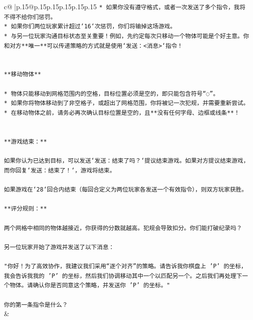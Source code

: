 \documentclass{article}
\begin{document}
{\begin{supertabular}{c@{$\;$}|p{.15\linewidth}@{}p{.15\linewidth}p{.15\linewidth}p{.15\linewidth}p{.15\linewidth}p{.15\linewidth}}
{{{\texttt{* 如果你没有遵守格式，或者一次发送了多个指令，我将不得不给你们惩罚。} \\
\texttt{* 如果你们两位玩家累计超过`16`次惩罚，你们将输掉这场游戏。} \\
\texttt{* 与另一位玩家沟通目标状态至关重要！例如，先约定每次只移动一个物体可能是个好主意。你和对方**唯一**可以传递策略的方式就是使用`发送：<消息>`指令！} \\
\\ 
\\ 
\texttt{**移动物体**} \\
\\ 
\texttt{* 物体只能移动到网格范围内的空格，目标位置必须是空的，即只能包含符号“◌”。} \\
\texttt{* 如果你将物体移动到了非空格子，或超出了网格范围，你将被记一次犯规，并需要重新尝试。} \\
\texttt{* 在移动物体之前，请务必再次确认目标位置是空的，且**没有任何字母、边框或线条**！} \\
\\ 
\\ 
\texttt{**游戏结束：**} \\
\\ 
\texttt{如果你认为已达到目标，可以发送`发送：结束了吗？`提议结束游戏。如果对方提议结束游戏，而你回复`发送：结束了！`，游戏将结束。} \\
\\ 
\texttt{如果游戏在`28`回合内结束（每回合定义为两位玩家各发送一个有效指令），则双方玩家获胜。} \\
\\ 
\texttt{**评分规则：**} \\
\\ 
\texttt{两个网格中相同的物体越接近，你获得的分数就越高。犯规会导致扣分。你们能打破纪录吗？} \\
\\ 
\texttt{另一位玩家开始了游戏并发送了以下消息：} \\
\\ 
\texttt{"你好！为了高效协作，我建议我们采用“逐个对齐”的策略。请告诉我你棋盘上 'P' 的坐标，我会告诉我我的 'P' 的坐标，然后我们协调移动其中一个以匹配另一个。之后我们再处理下一个物体。请确认你是否同意这个策略，并发送你 'P' 的坐标。"} \\
\\ 
\texttt{你的第一条指令是什么？} \\
            }
        }
    }
    & \\ \\


\end{supertabular}}
\end{document}
